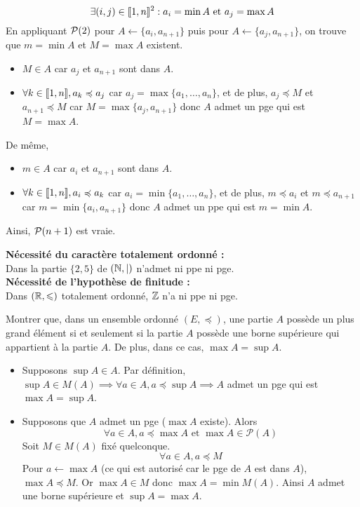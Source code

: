 \documentclass{article}
\begin{document}
\begin{question_kholle}
\begin{itemize}
          \[
            \exists(i,j)\in[\![ 1,n ]\!]^{2}: a_{i}=\min A \text{ et } a_{j}=\max A
          \]
          En appliquant $\mathcal P(2)$ pour $A\leftarrow \{a_{i}, a_{n+1}\}$ puis pour $A\leftarrow \{a_{j}, a_{n+1}\}$, on trouve que $m=\min A$ et $M=\max A$ existent.
          \begin{itemize}
            \item $M\in A$ car $a_{j}$ et $a_{n+1}$ sont dans $A$.
            \item $\forall k\in[\![ 1,n ]\!], a_{k}\preccurlyeq a_{j}$ car $a_{j}=\max \{a_{1}, \dots , a_{n}\}$, et de plus, $a_{j}\preccurlyeq M$ et $a_{n+1}\preccurlyeq M$ car $M=\max\{a_{j}, a_{n+1}\}$ donc $A$ admet un pge qui est $M=\max A$.
          \end{itemize}
          De même,
          \begin{itemize}
            \item $m\in A$ car $a_{i}$ et $a_{n+1}$ sont dans $A$.
            \item $\forall k\in[\![ 1,n ]\!], a_{i}\preccurlyeq a_{k}$ car $a_{i}=\min \{a_{1}, \dots , a_{n}\}$, et de plus, $m\preccurlyeq a_{i}$ et $m\preccurlyeq a_{n+1}$ car $m=\min\{a_{i}, a_{n+1}\}$ donc $A$ admet un ppe qui est $m=\min A$.
          \end{itemize}
          Ainsi, $\mathcal P(n+1)$ est vraie.
  \end{itemize}
  \vspace{1em}
  \textbf{Nécessité du caractère totalement ordonné :}\\
  Dans la partie $\{2,5\}$ de $(\mathbb N, |)$ n’admet ni ppe ni pge.\\[5pt]
  \textbf{Nécessité de l’hypothèse de finitude :}\\
  Dans $(\mathbb R, \leqslant)$ totalement ordonné, $\mathbb Z$ n’a ni ppe ni pge.
\end{question_kholle}

\begin{question_kholle}{Montrer que, dans un ensemble ordonné $(E,\preccurlyeq)$, une partie $A$ possède un plus grand élément si et seulement si la partie $A$ possède une borne supérieure qui appartient à la partie $A$. De plus, dans ce cas, $\max A = \sup A$.}
  \hfill\\
  \begin{itemize}
    \item Supposons $\sup A\in A$. Par définition, $\sup A\in M(A)\implies \forall a\in A, a\preccurlyeq \sup A \implies A$ admet un pge qui est $\max A=\sup A$.
    \item Supposons que $A$ admet un pge ($\max A$ existe). Alors
          \[
            \forall a\in A, a\preccurlyeq \max A \text{ et } \max A\in\mathcal{P}(A)
          \]
          Soit $M\in M(A)$ fixé quelconque.
          \[
            \forall a\in A, a\preccurlyeq M
          \]
          Pour $a\leftarrow \max A$ (ce qui est autorisé car le pge de $A$ est dans $A$), $\max A\preccurlyeq M$. Or $\max A\in M$ donc $\max A=\min M(A)$. Ainsi $A$ admet une borne supérieure et $\sup A=\max A$.
  \end{itemize}

\end{question_kholle}
\end{document}

